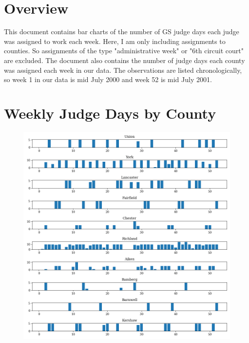 \documentclass[11pt]{article}
\begin{document}
\section{Overview}
  This document contains bar charts of the number of GS judge days each judge was assigned to work each week. Here, I am only including assignments to counties. So assignments of the type "administrative week" or "6th circuit court" are excluded. The document also contains the number of judge days each county was assigned each week in our data. The observations are listed chronologically, so week 1 in our data is mid July 2000 and week 52 is mid July 2001.

\section{Weekly Judge Days by County}
  \begin{figure}[H]
    \centering
    \includegraphics[width=\textwidth]{../../../output/figures/Exploration/County_weekly_judge_days_0}
  \end{figure}
\end{document}
